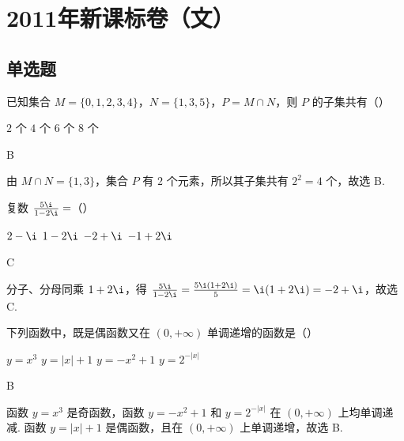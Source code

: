\chapter{2011年新课标卷（文）}

\section{单选题}

\begin{problem}
已知集合 \(M = \{0, 1, 2, 3, 4\}\)，\(N = \{1, 3, 5\}\)，\(P = M \cap N\)，则 \(P\) 的子集共有（\quad）

\choices
    {\(2\) 个}
    {\(4\) 个}
    {\(6\) 个}
    {\(8\) 个}

\end{problem}

\begin{answer}
B
\end{answer}

\begin{solution}
由 \(M\cap N=\{1,3\}\)，集合 \(P\) 有 \(2\) 个元素，所以其子集共有 \(2^2=4\) 个，故选 B.
\end{solution}

\begin{problem}
复数 \(\frac{5\i}{1 - 2\i} =\)（\quad）

\choices
    {\(2 - \i\)}
    {\(1 - 2\i\)}
    {\(-2 + \i\)}
    {\(-1 + 2\i\)}

\end{problem}

\begin{answer}
C
\end{answer}

\begin{solution}
分子、分母同乘 \(1+2\i\)，得 \(\frac{5\i}{1-2\i}=\frac{5\i(1+2\i)}{5}=\i(1+2\i)=-2+\i\)，故选 C.
\end{solution}

\begin{problem}
下列函数中，既是偶函数又在 \((0, +\infty)\) 单调递增的函数是（\quad）

\choices
    {\(y = x^{3}\)}
    {\(y = |x| + 1\)}
    {\(y = -x^{2} + 1\)}
    {\(y = 2^{-|x|}\)}

\end{problem}

\begin{answer}
B
\end{answer}

\begin{solution}
函数 \(y=x^3\) 是奇函数，函数 \(y=-x^2+1\) 和 \(y=2^{-|x|}\) 在 \((0,+\infty)\) 上均单调递减. 函数 \(y=|x|+1\) 是偶函数，且在 \((0,+\infty)\) 上单调递增，故选 B.
\end{solution}

